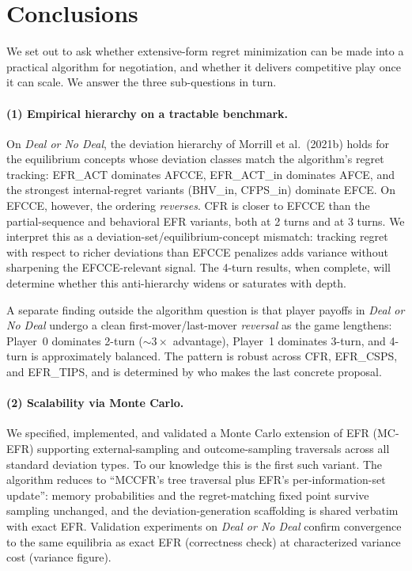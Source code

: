 \documentclass[11pt]{article}
\begin{document}
\newpage

\section{Conclusions}
\label{sec:conclusions}

We set out to ask whether extensive-form regret minimization can be made into a practical algorithm for negotiation, and whether it delivers competitive play once it can scale. We answer the three sub-questions in turn.

\paragraph{(1) Empirical hierarchy on a tractable benchmark.} On \emph{Deal or No Deal}, the deviation hierarchy of Morrill et al.\ (2021b) holds for the equilibrium concepts whose deviation classes match the algorithm's regret tracking: EFR\_ACT dominates AFCCE, EFR\_ACT\_in dominates AFCE, and the strongest internal-regret variants (BHV\_in, CFPS\_in) dominate EFCE. On EFCCE, however, the ordering \emph{reverses}. CFR is closer to EFCCE than the partial-sequence and behavioral EFR variants, both at 2 turns and at 3 turns. We interpret this as a deviation-set/equilibrium-concept mismatch: tracking regret with respect to richer deviations than EFCCE penalizes adds variance without sharpening the EFCCE-relevant signal. The 4-turn results, when complete, will determine whether this anti-hierarchy widens or saturates with depth.

A separate finding outside the algorithm question is that player payoffs in \emph{Deal or No Deal} undergo a clean first-mover/last-mover \emph{reversal} as the game lengthens: Player~0 dominates 2-turn ($\sim 3\times$ advantage), Player~1 dominates 3-turn, and 4-turn is approximately balanced. The pattern is robust across CFR, EFR\_CSPS, and EFR\_TIPS, and is determined by who makes the last concrete proposal.

\paragraph{(2) Scalability via Monte Carlo.} We specified, implemented, and validated a Monte Carlo extension of EFR (MC-EFR) supporting external-sampling and outcome-sampling traversals across all standard deviation types. To our knowledge this is the first such variant. The algorithm reduces to ``MCCFR's tree traversal plus EFR's per-information-set update'': memory probabilities and the regret-matching fixed point survive sampling unchanged, and the deviation-generation scaffolding is shared verbatim with exact EFR. Validation experiments on \emph{Deal or No Deal} confirm convergence to the same equilibria as exact EFR (correctness check) at characterized variance cost (variance figure).
\end{document}

